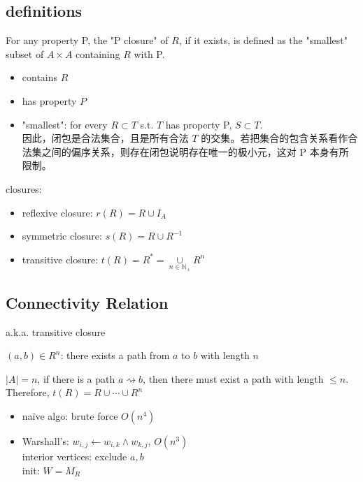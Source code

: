 \documentclass[12pt, a4paper, UTF8, openany]{ctexbook}
\newcommand{\field}[1]{\mathbb{#1}}%
\begin{document}
    \subsection{definitions}
        For any property P, the "P closure" of $R$, if it exists, is defined as the "smallest" subset of $A \times A$ containing $R$ with P.

        \begin{itemize}
            \item contains $R$
            \item has property $P$
            \item "smallest": for every $R \subset T$ s.t. $T$ has property P, $S \subset T$.\\
                因此，闭包是合法集合，且是所有合法 $T$ 的交集。若把集合的包含关系看作合法集之间的偏序关系，则存在闭包说明存在{\heiti 唯一}的极小元，这对 P 本身有所限制。
        \end{itemize}

        closures:
        \begin{itemize}
            \item reflexive closure: $r(R) = R \cup I_A$
            \item symmetric closure: $s(R) = R \cup R^{-1}$
            \item transitive closure: $t(R) = R^\ast = \mathop\cup\limits_{n \in \field{N}_+} R^n$
        \end{itemize}

    \subsection{Connectivity Relation}
        a.k.a. transitive closure

        $(a, b) \in R^n$: there exists a path from $a$ to $b$ with length $n$

        $|A| = n$, if there is a path $a \rightsquigarrow b$, then there must exist a path with length $\leqslant n$. 
        Therefore, $t(R) = R \cup \cdots \cup R^n$

        \begin{itemize}
            \item naïve algo: brute force $O(n^4)$
            \item Warshall's: $w_{i, j} \gets w_{i, k} \land w_{k, j}$, $O(n^3)$ \\
                interior vertices: exclude $a, b$ \\
                init: $W = M_R$
        \end{itemize}
\end{document}
